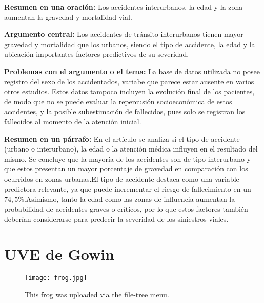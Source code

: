\documentclass{book}
\begin{document}
\textbf{Resumen en una oración:} Los accidentes interurbanos, la edad y la zona aumentan la gravedad y mortalidad vial.

\textbf{Argumento central:} Los accidentes de tránsito interurbanos tienen mayor gravedad y mortalidad que los urbanos, siendo el tipo de accidente, la edad y la ubicación importantes factores predictivos de su severidad.

\textbf{Problemas con el argumento o el tema:} La base de datos utilizada no posee registro del sexo de los accidentados, variabe que parece estar ausente en varios otros estudios. Estos datos tampoco incluyen la evolución final de los pacientes, de modo que no se puede evaluar la repercusión socioeconómica de estos accidentes, y la posible subestimación de fallecidos, pues solo se registran los fallecidos al momento de la atención inicial.

\textbf{Resumen en un párrafo:} En el artículo se analiza si el tipo de accidente (urbano o interurbano), la edad o la atención médica influyen en el resultado del mismo. Se concluye que la mayoría de los accidentes son de tipo interurbano y que estos presentan un mayor porcentaje de gravedad en comparación con los ocurridos en zonas urbanas.El tipo de accidente destaca como una variable predictora relevante, ya que puede incrementar el riesgo de fallecimiento en un $74,5\%$.Asimismo, tanto la edad como las zonas de influencia aumentan la probabilidad de accidentes graves o críticos, por lo que estos factores también deberían considerarse para predecir la severidad de los siniestros viales.

\section{UVE de Gowin}

\begin{figure}
\centering
\texttt{[image: frog.jpg]}
\caption{\label{fig:frog}This frog was uploaded via the file-tree menu.}
\end{figure}
\end{document}
